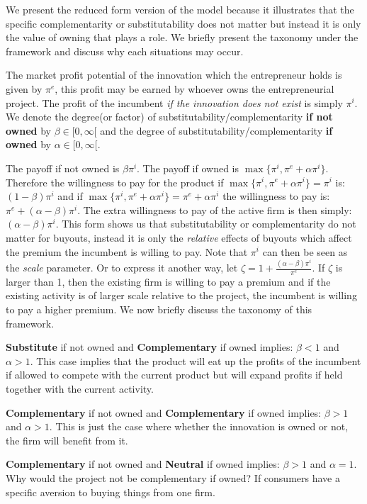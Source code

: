 \documentclass[11pt]{article}
\begin{document}
We present the reduced form version of the model because it illustrates that the specific complementarity or substitutability does not matter but instead it is only the  value of owning that plays a role.  We briefly present the taxonomy under the framework and discuss why each situations may occur. 

The market profit potential of the innovation which the entrepreneur holds is given by $\pi^e$, this profit may be earned by whoever owns the entrepreneurial project. The profit of the incumbent \textit{if the innovation does not exist} is simply $\pi^i$. We denote the degree(or factor) of substitutability/complementarity \textbf{if not owned} by $\beta \in [ 0, \infty [$ and the degree of substitutability/complementarity  \textbf{if owned} by $\alpha \in [0, \infty [ $. 

The payoff if not owned is $ \beta \pi^i$. The payoff if owned is $\max\{ \pi^i, \pi^e + \alpha \pi^i   \}$. Therefore the willingness to pay for the product if  $\max\{ \pi^i, \pi^e + \alpha \pi^i   \} = \pi^i $ is: $(1-\beta) \pi^i$ and if $\max\{ \pi^i, \pi^e + \alpha \pi^i   \} = \pi^e + \alpha \pi^i $ the willingness to pay is: $\pi^e+ (\alpha-\beta) \pi^i$. The extra willingness to pay of the active firm is then simply: $(\alpha-\beta)\pi^i$. This form shows us that substitutability or complementarity do not matter for buyouts, instead it is only the \textit{relative} effects of buyouts which affect the premium the incumbent is willing to pay. Note that $\pi^i$ can then be seen as the \textit{scale} parameter. Or to express it another way, let $\zeta=1 + \frac{(\alpha-\beta)\pi^i}{\pi^e}$. If $\zeta$ is larger than 1, then the existing firm is willing to pay a premium and if the existing activity is of larger scale relative to the project, the incumbent is willing to pay a higher premium. We now briefly discuss the taxonomy of this framework. 

\textbf{Substitute}  if not owned and \textbf{Complementary} if owned implies: $\beta<1$ and $\alpha>1$. This case implies that the product will eat up the profits of the incumbent if allowed to compete with the current product but will expand profits if held together with the current activity. 

\textbf{Complementary} if not owned and \textbf{Complementary} if owned implies: $\beta>1$ and $\alpha>1$. This is just the case where whether the innovation is owned or not, the firm will benefit from it.

\textbf{Complementary} if not owned and \textbf{Neutral} if owned implies: $\beta>1$ and $\alpha=1$. Why would the project not be complementary if owned? If consumers have a specific aversion to buying things from one firm. 
\end{document}
